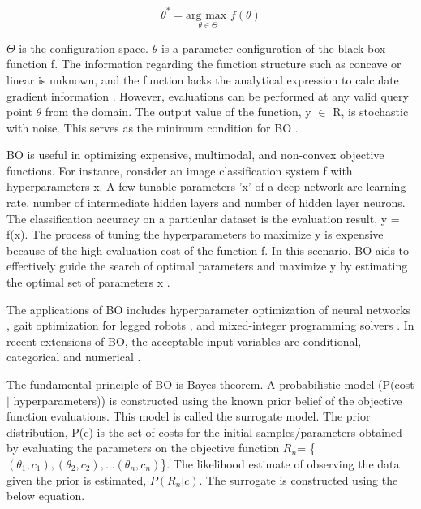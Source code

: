 \begin{equation}
    \theta^* = \underset{\theta\in\Theta}{\text{arg max }} f(\theta) 
\end{equation}

$\Theta$ is the configuration space. $\theta$ is a parameter configuration of the black-box function f.  The information regarding the function structure such as concave or linear is unknown, and the function lacks the analytical expression to calculate gradient information \cite{BayesianOptimization_papertutorials}. However, evaluations can be performed at any valid query point $\theta$ from the domain. The output value of the function, y $\in$ R, is stochastic with noise. This serves as the minimum condition for BO \cite{Bayesianoptimization_review}.

BO is useful in optimizing expensive, multimodal, and non-convex objective functions. For instance, consider an image classification system f with hyperparameters x. A few tunable parameters 'x' of a deep network are learning rate, number of intermediate hidden layers and number of hidden layer neurons. The classification accuracy on a particular dataset is the evaluation result, y = f(x). The process of tuning the hyperparameters to maximize y is expensive because of the high evaluation cost of the function f. In this scenario, BO aids to effectively guide the search of optimal parameters and maximize y by estimating the optimal set of parameters x \cite{Bayesianoptimization_review} \cite{BayesianOptimization_papertutorials}. 

The applications of BO includes hyperparameter optimization of neural networks \cite{hponn}, gait optimization for legged robots \cite{robotgait}, and mixed-integer programming solvers \cite{SMAC_mainpaper}. In recent extensions of BO, the acceptable input variables are conditional, categorical and numerical \cite{SMAC_mainpaper} \cite{Bayesianoptimization_review} \cite{BayesianOptimization_papertutorials}.


The fundamental principle of BO is Bayes theorem. A probabilistic model (P(cost $\vert$ hyperparameters)) is constructed using the known prior belief of the objective function evaluations. This model is called the surrogate model. The prior distribution, P(c) is the set of costs for the initial samples/parameters obtained by evaluating the parameters on the objective function $R_n$= \{$(\theta_1,c_1),(\theta_2,c_2),...(\theta_n,c_n)$\}. The likelihood estimate of observing the data given the prior is estimated, $P(R_n|c)$. The surrogate is constructed using the below equation.

